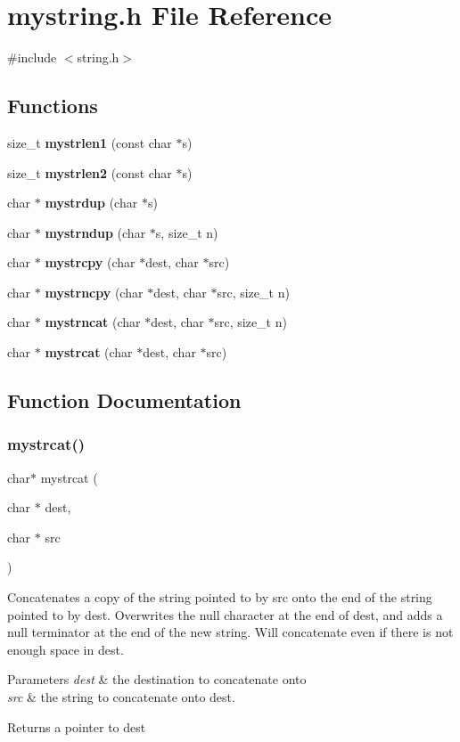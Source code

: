 \section{mystring.\+h File Reference}
\label{mystring_8h}
{\ttfamily \#include $<$string.\+h$>$}\newline
\subsection*{Functions}
\begin{DoxyCompactItemize}
\item 
size\+\_\+t \textbf{ mystrlen1} (const char $\ast$s)
\item 
size\+\_\+t \textbf{ mystrlen2} (const char $\ast$s)
\item 
char $\ast$ \textbf{ mystrdup} (char $\ast$s)
\item 
char $\ast$ \textbf{ mystrndup} (char $\ast$s, size\+\_\+t n)
\item 
char $\ast$ \textbf{ mystrcpy} (char $\ast$dest, char $\ast$src)
\item 
char $\ast$ \textbf{ mystrncpy} (char $\ast$dest, char $\ast$src, size\+\_\+t n)
\item 
char $\ast$ \textbf{ mystrncat} (char $\ast$dest, char $\ast$src, size\+\_\+t n)
\item 
char $\ast$ \textbf{ mystrcat} (char $\ast$dest, char $\ast$src)
\end{DoxyCompactItemize}


\subsection{Function Documentation}
\mbox{\label{mystring_8h_a68e51a014c7210b524d657b665d09db8}} 
\subsubsection{mystrcat()}
{\footnotesize\ttfamily char$\ast$ mystrcat (\begin{DoxyParamCaption}\item[{char $\ast$}]{dest,  }\item[{char $\ast$}]{src }\end{DoxyParamCaption})}

Concatenates a copy of the string pointed to by src onto the end of the string pointed to by dest. Overwrites the null character at the end of dest, and adds a null terminator at the end of the new string. Will concatenate even if there is not enough space in dest. 
\begin{DoxyParams}{Parameters}
{\em dest} & the destination to concatenate onto \\
\hline
{\em src} & the string to concatenate onto dest. \\
\hline
\end{DoxyParams}
\begin{DoxyReturn}{Returns}
a pointer to dest 
\end{DoxyReturn}


